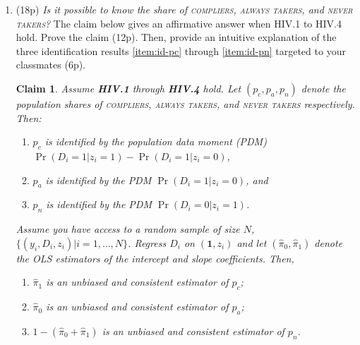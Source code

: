 \documentclass{article}
\newtheorem{claim}[theorem]{Claim}
\begin{document}
\begin{enumerate}[label=\textbf{Q\arabic{enumi}}.,ref=Q\arabic{enumi}, wide=0pt, itemsep=0em, topsep=5pt, labelindent=0pt, resume]



\item (18p) \textit{Is it possible to know the share of \textsc{compliers}, \textsc{always takers}, and \textsc{never takers}?} The claim below gives an affirmative answer when HIV.1 to HIV.4 hold. Prove the claim (12p). Then, provide an intuitive explanation of the three identification results \ref{item:id-pc} through \ref{item:id-pn} targeted to your classmates (6p).
\begin{claim}\label{cl:identification_shares}
Assume \textbf{HIV.1} through \textbf{HIV.4} hold. Let $(p_{c},p_{a},p_{n})$ denote the population shares of \textsc{compliers}, \textsc{always takers}, and \textsc{never takers} respectively.  Then:
\begin{enumerate}[label=(\alph*)]
\item $p_c$ is identified by the population data moment (PDM) $\Pr(D_i=1|z_i=1)-\Pr(D_i=1|z_i=0)$,\label{item:id-pc} 
\item $p_a$ is identified by the PDM $\Pr(D_i=1|z_i=0)$, and \label{item:id-pa}
\item $p_n$ is identified by the PDM $\Pr(D_i=0|z_i=1)$. \label{item:id-pn}
\end{enumerate}
Assume you have access to a random sample of size $N$, $\{(y_i,D_i,z_i)|i=1,\ldots,N\}$. Regress $D_i$ on $(\mathbf{1},z_i)$ and let $(\hat{\pi}_0,\hat{\pi}_1)$ denote the OLS estimators of the intercept and slope coefficients. Then,
\begin{enumerate}[label=(\alph*), resume]
\item $\hat{\pi}_1$ is an unbiased and consistent estimator of $p_c$;
\item $\hat{\pi}_0$ is an unbiased and consistent estimator of $p_a$;
\item $1- (\hat{\pi}_0+\hat{\pi}_1)$ is an unbiased and consistent estimator of $p_n$.
\end{enumerate}
\end{claim}




\end{enumerate}
\end{document}
